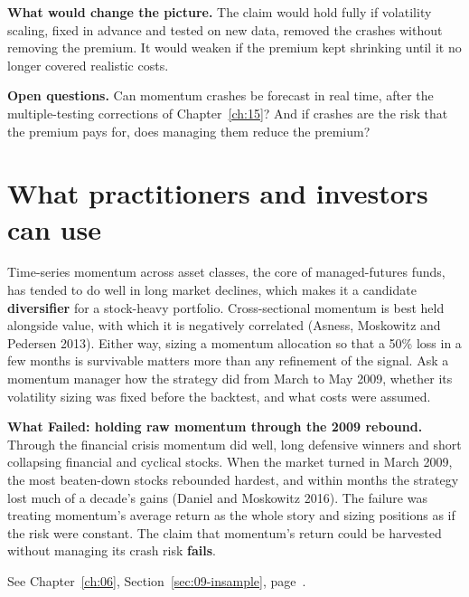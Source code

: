 \textbf{What would change the picture.} The claim would hold fully if volatility scaling, fixed in advance and tested on new data, removed the crashes without removing the premium. It would weaken if the premium kept shrinking until it no longer covered realistic costs.

\label{sec:05-open}
\textbf{Open questions.} Can momentum crashes be forecast in real time, after the multiple-testing corrections of Chapter~\ref{ch:15}? And if crashes are the risk that the premium pays for, does managing them reduce the premium?

\section{What practitioners and investors can use}
\label{sec:05-investors}

Time-series momentum across asset classes, the core of managed-futures funds, has tended to do well in long market declines, which makes it a candidate \textbf{diversifier} for a stock-heavy portfolio. Cross-sectional momentum is best held alongside value, with which it is negatively correlated (Asness, Moskowitz and Pedersen 2013). Either way, sizing a momentum allocation so that a 50\% loss in a few months is survivable matters more than any refinement of the signal. Ask a momentum manager how the strategy did from March to May 2009, whether its volatility sizing was fixed before the backtest, and what costs were assumed.

\begin{callout}
\textbf{What Failed: holding raw momentum through the 2009 rebound.} Through the financial crisis momentum did well, long defensive winners and short collapsing financial and cyclical stocks. When the market turned in March 2009, the most beaten-down stocks rebounded hardest, and within months the strategy lost much of a decade's gains (Daniel and Moskowitz 2016). The failure was treating momentum's average return as the whole story and sizing positions as if the risk were constant. The claim that momentum's return could be harvested without managing its crash risk \textbf{fails}.
\end{callout}

\makeatletter
{}
\makeatother

\begin{keyterms}
\small
\begin{description}[leftmargin=0pt, itemsep=2pt, parsep=0pt, font=\normalfont\bfseries\color{FEMaroon}]
  \item[In-sample versus out-of-sample.] See Chapter~\ref{ch:06}, Section~\ref{sec:09-insample}, page~\pageref{sec:09-insample}.
\end{description}
\end{keyterms}
